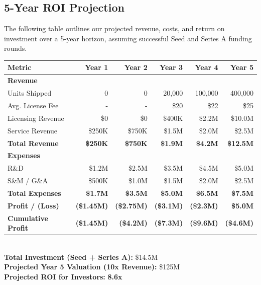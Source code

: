 \documentclass{article}
\begin{document}
\subsection{5-Year ROI Projection}
The following table outlines our projected revenue, costs, and return on investment over a 5-year horizon, assuming successful Seed and Series A funding rounds.

\begin{tabular}{|l|r|r|r|r|r|}
\hline
\textbf{Metric} & \textbf{Year 1} & \textbf{Year 2} & \textbf{Year 3} & \textbf{Year 4} & \textbf{Year 5} \\
\hline
\hline
\textbf{Revenue} & & & & & \\
Units Shipped & 0 & 0 & 20,000 & 100,000 & 400,000 \\
Avg. License Fee & - & - & \$20 & \$22 & \$25 \\
Licensing Revenue & \$0 & \$0 & \$400K & \$2.2M & \$10.0M \\
Service Revenue & \$250K & \$750K & \$1.5M & \$2.0M & \$2.5M \\
\textbf{Total Revenue} & \textbf{\$250K} & \textbf{\$750K} & \textbf{\$1.9M} & \textbf{\$4.2M} & \textbf{\$12.5M} \\
\hline
\textbf{Expenses} & & & & & \\
R\&D & \$1.2M & \$2.5M & \$3.5M & \$4.5M & \$5.0M \\
S\&M / G\&A & \$500K & \$1.0M & \$1.5M & \$2.0M & \$2.5M \\
\textbf{Total Expenses} & \textbf{\$1.7M} & \textbf{\$3.5M} & \textbf{\$5.0M} & \textbf{\$6.5M} & \textbf{\$7.5M} \\
\hline
\textbf{Profit / (Loss)} & \textbf{(\$1.45M)} & \textbf{(\$2.75M)} & \textbf{(\$3.1M)} & \textbf{(\$2.3M)} & \textbf{\$5.0M} \\
\hline
\textbf{Cumulative Profit} & \textbf{(\$1.45M)} & \textbf{(\$4.2M)} & \textbf{(\$7.3M)} & \textbf{(\$9.6M)} & \textbf{(\$4.6M)} \\
\hline
\end{tabular}
\\
\vspace{0.1in}
\textbf{Total Investment (Seed + Series A):} \$14.5M \\
\textbf{Projected Year 5 Valuation (10x Revenue):} \$125M \\
\textbf{Projected ROI for Investors:} \textbf{8.6x}
\end{document}
